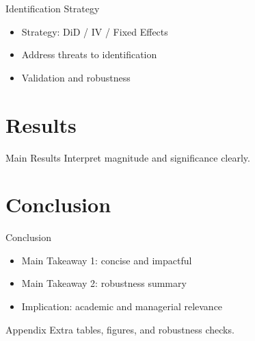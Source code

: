 \documentclass[aspectratio=169,11pt]{beamer}
\begin{document}
\begin{frame}{Identification Strategy}
  \begin{itemize}
    \item Strategy: DiD / IV / Fixed Effects
    \item Address threats to identification
    \item Validation and robustness
  \end{itemize}
\end{frame}

\section{Results}
\begin{frame}{Main Results}
  \alert{Interpret magnitude and significance clearly.}
\end{frame}

\section{Conclusion}
\begin{frame}{Conclusion}
  \begin{itemize}
    \item \alert{Main Takeaway 1:} concise and impactful
    \item \alert{Main Takeaway 2:} robustness summary
    \item \alert{Implication:} academic and managerial relevance
  \end{itemize}
\end{frame}

\appendix
\begin{frame}{Appendix}
  Extra tables, figures, and robustness checks.
\end{frame}
\end{document}
